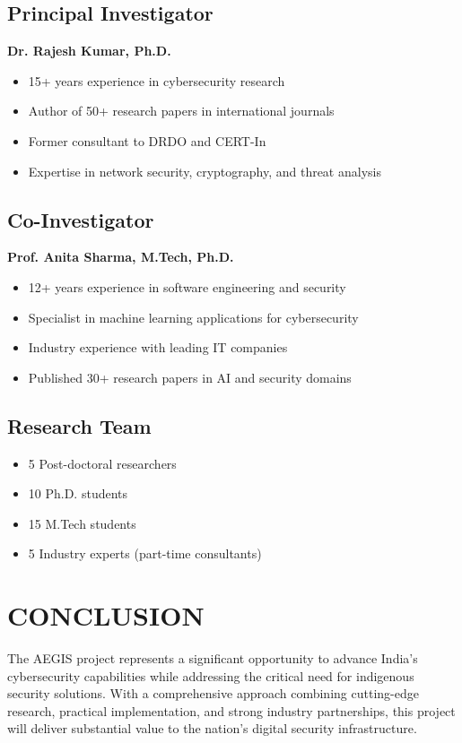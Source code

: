 \documentclass[12pt,a4paper]{article}
\begin{document}
\subsection{Principal Investigator}
\textbf{Dr. Rajesh Kumar, Ph.D.}
\begin{itemize}
\item 15+ years experience in cybersecurity research
\item Author of 50+ research papers in international journals
\item Former consultant to DRDO and CERT-In
\item Expertise in network security, cryptography, and threat analysis
\end{itemize}

\subsection{Co-Investigator}
\textbf{Prof. Anita Sharma, M.Tech, Ph.D.}
\begin{itemize}
\item 12+ years experience in software engineering and security
\item Specialist in machine learning applications for cybersecurity
\item Industry experience with leading IT companies
\item Published 30+ research papers in AI and security domains
\end{itemize}

\subsection{Research Team}
\begin{itemize}
\item 5 Post-doctoral researchers
\item 10 Ph.D. students
\item 15 M.Tech students
\item 5 Industry experts (part-time consultants)
\end{itemize}

\section{CONCLUSION}

The AEGIS project represents a significant opportunity to advance India's cybersecurity capabilities while addressing the critical need for indigenous security solutions. With a comprehensive approach combining cutting-edge research, practical implementation, and strong industry partnerships, this project will deliver substantial value to the nation's digital security infrastructure.
\end{document}
